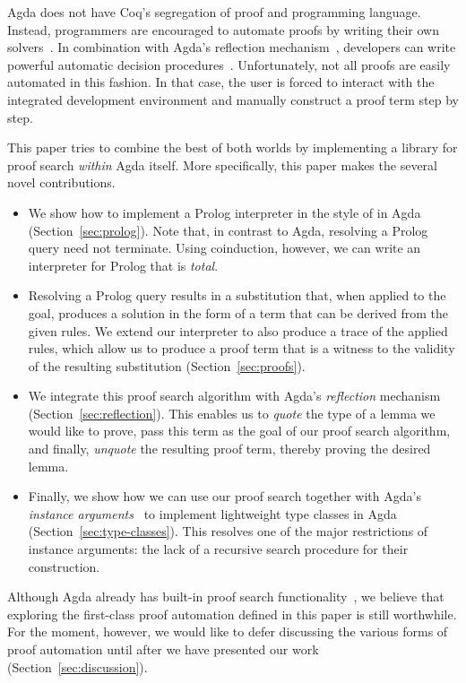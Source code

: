 \documentclass[preprint]{sigplanconf}
\begin{document}
Agda does not have Coq's segregation of proof and programming
language.  Instead, programmers are encouraged to automate proofs by
writing their own solvers~\cite{ulf-tphols}. In combination with
Agda's reflection mechanism~\cite{agda-relnotes-228,van-der-walt}, developers can write
powerful automatic decision procedures~\cite{allais}. Unfortunately,
not all proofs are easily automated in this fashion. In that case,
the user is forced to interact with the integrated development
environment and manually construct a proof term step by step.

This paper tries to combine the best of both worlds by implementing a
library for proof search \emph{within} Agda itself. More specifically,
this paper makes the several novel contributions.

\begin{itemize}
\item %
  We show how to implement a Prolog interpreter in the style of
  \citet{stutterheim} in Agda (Section~\ref{sec:prolog}). Note that,
  in contrast to Agda, resolving a Prolog query need not terminate.
  Using coinduction, however, we can write an interpreter for Prolog
  that is \emph{total}.
\item %
  Resolving a Prolog query results in a substitution that, when applied
  to the goal, produces a solution in the form of a term that can be
  derived from the given rules.
  We extend our interpreter to also produce a trace of the applied
  rules, which allow us to produce a proof term that is a witness to
  the validity of the resulting substitution (Section~\ref{sec:proofs}).
\item %
  We integrate this proof search algorithm with Agda's
  \emph{reflection} mechanism (Section~\ref{sec:reflection}). This
  enables us to \emph{quote} the type of a lemma we would like to
  prove, pass this term as the goal of our proof search algorithm, and
  finally, \emph{unquote} the resulting proof term, thereby proving
  the desired lemma.
\item %
  Finally, we show how we can use our proof search together with
  Agda's \emph{instance arguments}~\cite{instance-args} to implement
  lightweight type classes in Agda (Section~\ref{sec:type-classes}).
  This resolves one of the major restrictions of instance arguments:
  the lack of a recursive search procedure for their construction.
\end{itemize}

Although Agda already has built-in proof search
functionality~\cite{lindblad}, we believe that exploring the
first-class proof automation defined in this paper is still
worthwhile. For the moment, however, we would like to defer discussing
the various forms of proof automation until after we have
presented our work (Section~\ref{sec:discussion}).
\end{document}
